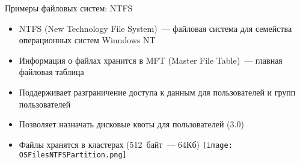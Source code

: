 \documentclass[aspectratio=169,14pt]{beamer}
\begin{document}
\begin{frame}{Примеры файловых систем: NTFS}
    \begin{itemize}
        \item NTFS (New Technology File System)~--- файловая система для
        семейства операционных систем Winndows NT
        \item Информация о файлах хранится в MFT (Master File Table)~--- главная
        файловая таблица
        \item Поддерживает разграничение доступа к данным для пользователей и
        групп пользователей
        \item Позволяет назначать дисковые квоты для пользователей (3.0)
        \item Файлы хранятся в кластерах (512~байт~--- 64Кб)
        \texttt{[image: OSFilesNTFSPartition.png]}
    \end{itemize}
\end{frame}
\end{document}
